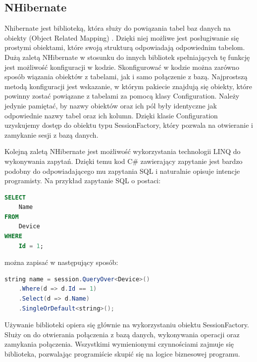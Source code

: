 \subsection{NHibernate}
Nhibernate jest biblioteką, która służy do powiązania tabel baz danych na obiekty (Object Related Mapping) \cite{nhibernate-doc}. Dzięki niej możliwe jest posługiwanie się prostymi obiektami, które swoją strukturą odpowiadają odpowiednim tabelom. Dużą zaletą NHibernate w stosunku do innych bibliotek spełniających tę funkcję jest możliwość konfiguracji w kodzie. Skonfigurować w kodzie można zarówno sposób wiązania obiektów z tabelami, jak i samo połączenie z bazą. Najprostszą metodą konfiguracji jest wskazanie, w którym pakiecie znajdują się obiekty, które powinny zostać powiązane z tabelami za pomocą klasy Configuration. Należy jedynie pamiętać, by nazwy obiektów oraz ich pól były identyczne jak odpowiednie nazwy tabel oraz ich kolumn. Dzięki klasie Configuration uzyskujemy dostęp do obiektu typu SessionFactory, który pozwala na otwieranie i zamykanie sesji z bazą danych. 

Kolejną zaletą NHibernate jest możliwość wykorzystania technologii LINQ do wykonywania zapytań. Dzięki temu kod C\# zawierający zapytanie jest bardzo podobny do odpowiadającego mu zapytania SQL i naturalnie opisuje intencje programisty. Na przykład zapytanie SQL o postaci:
\begin{lstlisting}[language=SQL]
SELECT
    Name
FROM
    Device
WHERE
    Id = 1;
\end{lstlisting}
można zapisać w następujący sposób:
\begin{lstlisting}[language=Java]
string name = session.QueryOver<Device>()
    .Where(d => d.Id == 1)
    .Select(d => d.Name)
    .SingleOrDefault<string>();
\end{lstlisting}
Używanie biblioteki opiera się głównie na wykorzystaniu obiektu SessionFactory. Służy on do otwierania połączenia z bazą danych, wykonywania operacji oraz zamykania połączenia. Wszystkimi wymienionymi czynnościami zajmuje się biblioteka, pozwalając programiście skupić się na logice biznesowej programu.

